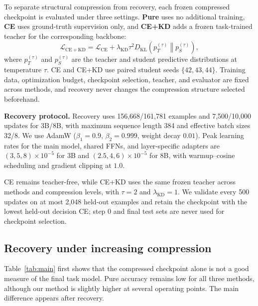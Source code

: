 \documentclass{article}
\newcommand{\KL}{D_{\mathrm{KL}}}
\begin{document}
To separate structural compression from recovery, each frozen compressed
checkpoint is evaluated under three settings. \textbf{Pure} uses no additional
training, \textbf{CE} uses ground-truth supervision only, and \textbf{CE+KD}
adds a frozen task-trained teacher for the corresponding backbone:
\begin{equation}
\mathcal L_{\mathrm{CE+KD}}
=
\mathcal L_{\mathrm{CE}}
+
\lambda_{\mathrm{KD}}\tau^2
\KL\!\left(p_T^{(\tau)}\middle\|p_S^{(\tau)}\right),
\label{eq:kd}
\end{equation}
where $p_T^{(\tau)}$ and $p_S^{(\tau)}$ are the teacher and student predictive
distributions at temperature $\tau$. CE and CE+KD use paired student seeds
$\{42,43,44\}$. Training data, optimization budget, checkpoint selection,
teacher, and evaluator are fixed across methods, and recovery never changes
the compression structure selected beforehand.

\medskip
\noindent\textbf{Recovery protocol.}
Recovery uses 156,668/161,781 examples and 7,500/10,000 updates for 3B/8B,
with maximum sequence length 384 and effective batch sizes 32/8. We use AdamW
($\beta_1=0.9$, $\beta_2=0.999$, weight decay $0.01$). Peak learning rates
for the main model, shared FFNs, and layer-specific adapters are
$(3,5,8)\times10^{-5}$ for 3B and $(2.5,4,6)\times10^{-5}$ for 8B, with
warmup--cosine scheduling and gradient clipping at $1.0$.

CE remains teacher-free, while CE+KD uses the same frozen teacher across
methods and compression levels, with $\tau=2$ and
$\lambda_{\mathrm{KD}}=1$. We validate every 500 updates on at most 2,048
held-out examples and retain the checkpoint with the lowest held-out decision
CE; step 0 and final test sets are never used for checkpoint selection.





\subsection{Recovery under increasing compression}

Table~\ref{tab:main} first shows that the compressed checkpoint alone is not a
good measure of the final task model. Pure accuracy remains low for all three
methods, although our method is slightly higher at several operating points.
The main difference appears after recovery.
\end{document}
